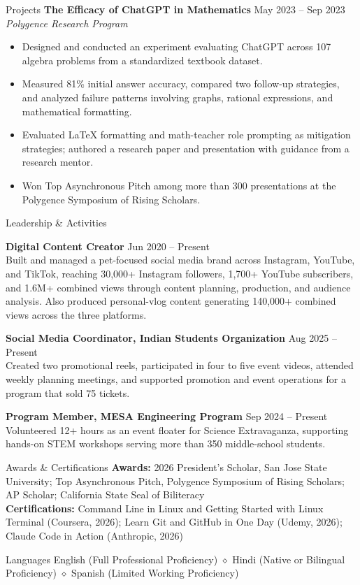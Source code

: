 \documentclass{resume}
\begin{document}
\begin{rSection}{Projects}
\textbf{The Efficacy of ChatGPT in Mathematics} \hfill May 2023 -- Sep 2023\\
\textit{Polygence Research Program}
\begin{itemize}
    \itemsep -3pt {}
    \item Designed and conducted an experiment evaluating ChatGPT across 107 algebra problems from a standardized textbook dataset.
    \item Measured 81\% initial answer accuracy, compared two follow-up strategies, and analyzed failure patterns involving graphs, rational expressions, and mathematical formatting.
    \item Evaluated LaTeX formatting and math-teacher role prompting as mitigation strategies; authored a research paper and presentation with guidance from a research mentor.
    \item Won Top Asynchronous Pitch among more than 300 presentations at the Polygence Symposium of Rising Scholars.
\end{itemize}

\end{rSection}

\begin{rSection}{Leadership \& Activities}

\textbf{Digital Content Creator} \hfill Jun 2020 -- Present\\
Built and managed a pet-focused social media brand across Instagram, YouTube, and TikTok, reaching 30,000+ Instagram followers, 1,700+ YouTube subscribers, and 1.6M+ combined views through content planning, production, and audience analysis. Also produced personal-vlog content generating 140,000+ combined views across the three platforms.

\textbf{Social Media Coordinator, Indian Students Organization} \hfill Aug 2025 -- Present\\
Created two promotional reels, participated in four to five event videos, attended weekly planning meetings, and supported promotion and event operations for a program that sold 75 tickets.

\textbf{Program Member, MESA Engineering Program} \hfill Sep 2024 -- Present\\
Volunteered 12+ hours as an event floater for Science Extravaganza, supporting hands-on STEM workshops serving more than 350 middle-school students.

\end{rSection}

\begin{rSection}{Awards \& Certifications}
\textbf{Awards:} 2026 President's Scholar, San Jose State University; Top Asynchronous Pitch, Polygence Symposium of Rising Scholars; AP Scholar; California State Seal of Biliteracy\\
\textbf{Certifications:} Command Line in Linux and Getting Started with Linux Terminal (Coursera, 2026); Learn Git and GitHub in One Day (Udemy, 2026); Claude Code in Action (Anthropic, 2026)
\end{rSection}

\begin{rSection}{Languages}
English (Full Professional Proficiency) $\diamond$ Hindi (Native or Bilingual Proficiency) $\diamond$ Spanish (Limited Working Proficiency)
\end{rSection}
\end{document}

